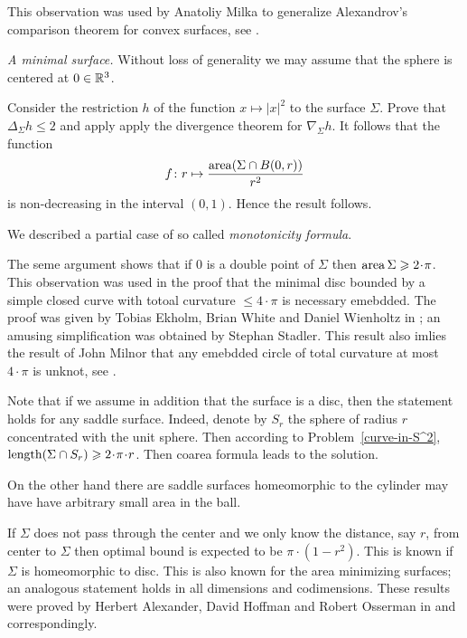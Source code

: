 This  observation was used by Anatoliy Milka
to generalize Alexandrov's comparison theorem for convex surfaces, see \cite{milka-geod}.

\textit{A minimal surface.}
Without loss of generality we may assume that the sphere is centered at $0\in\mathbb{R}^3$.

Consider the restriction $h$ of the function $x\mapsto |x|^2$ to the surface $\Sigma$.
Prove that $\Delta_\Sigma h\le 2$ and apply apply the divergence theorem for $\nabla_\Sigma h$.
It follows that the function
\[f\colon r\mapsto \frac{\operatorname{\rm area}(\Sigma\cap B(0,r))}{r^2}
\]
is non-decreasing in the interval $(0,1)$.
Hence the result follows.

We described a partial case of so called \emph{monotonicity formula}.

The seme argument shows that if $0$ is a double point
of $\Sigma$ then $\area\Sigma\ge 2\cdot \pi$.
This observation was used in the proof 
that the minimal disc bounded by a simple closed curve with totoal curvature $\le 4\cdot\pi$ is necessary emebdded.
The proof was given by 
Tobias Ekholm, 
Brian White
and Daniel Wienholtz
in \cite{EWW};
an amusing simplification 
was obtained by 
Stephan Stadler. %
This result also imlies the result of John Milnor that any emebdded circle of total curvature at most $4\cdot\pi$ is unknot, see \cite{milnor}.

Note that if we assume in addition that the surface is a disc,
then the statement holds for any saddle surface. 
Indeed, denote by $S_r$ the sphere of radius $r$ concentrated with the unit sphere. 
Then according to Problem~\ref{curve-in-S^2}, 
$\length(\Sigma\cap S_r)\ge 2\cdot\pi\cdot r$.
Then coarea formula leads to the solution.

On the other hand there are saddle surfaces homeomorphic to the cylinder
may have have arbitrary small area in the ball. 

If $\Sigma$ does not pass through the center 
and we only know the distance, say $r$, 
from center to $\Sigma$ 
then optimal bound is expected to be $\pi\cdot(1-r^2)$.
This is known if $\Sigma$ is homeomorphic to  disc.
This is also known for the area minimizing surfaces;
an analogous statement
holds in all dimensions and codimensions.
These results were proved by 
Herbert Alexander, 
David Hoffman
and Robert Osserman in \cite{alexander-osserman} and \cite{alexander-hoffman-osserman} correspondingly.






